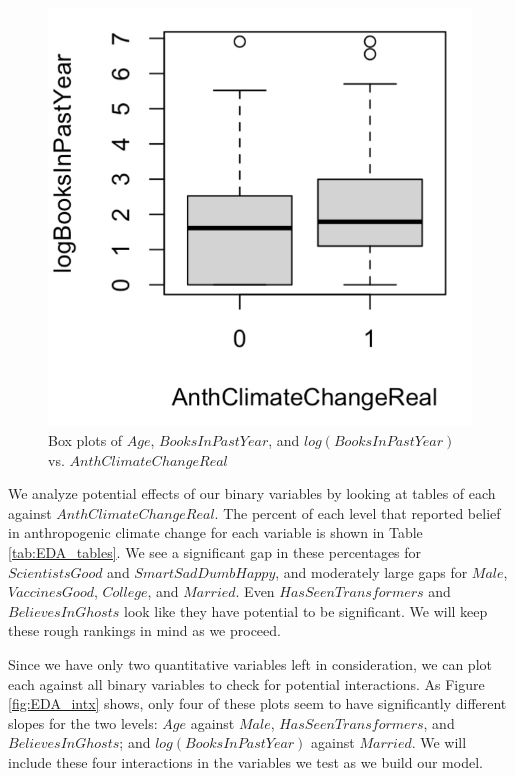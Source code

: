 \begin{figure}[h]
    \includegraphics[scale=.45]{boxplot_logbooks_anth.png}
    \caption{Box plots of $Age$, $BooksInPastYear$, and $log(BooksInPastYear)$ vs. $AnthClimateChangeReal$}
    \label{fig:EDA_boxplots}
\end{figure}

\par We analyze potential effects of our binary variables by looking at tables of each against $AnthClimateChangeReal$. The percent of each level that reported belief in anthropogenic climate change for each variable is shown in Table \ref{tab:EDA_tables}. We see a significant gap in these percentages for $ScientistsGood$ and $SmartSadDumbHappy$, and moderately large gaps for $Male$, $VaccinesGood$, $College$, and $Married$. Even $HasSeenTransformers$ and $BelievesInGhosts$ look like they have potential to be significant. We will keep these rough rankings in mind as we proceed.

\par \bigskip Since we have only two quantitative variables left in consideration, we can plot each against all binary variables to check for potential interactions. As Figure \ref{fig:EDA_intx} shows, only four of these plots seem to have significantly different slopes for the two levels: $Age$ against $Male$, $HasSeenTransformers$, and $BelievesInGhosts$; and $log(BooksInPastYear)$ against $Married$. We will include these four interactions in the variables we test as we build our model.

